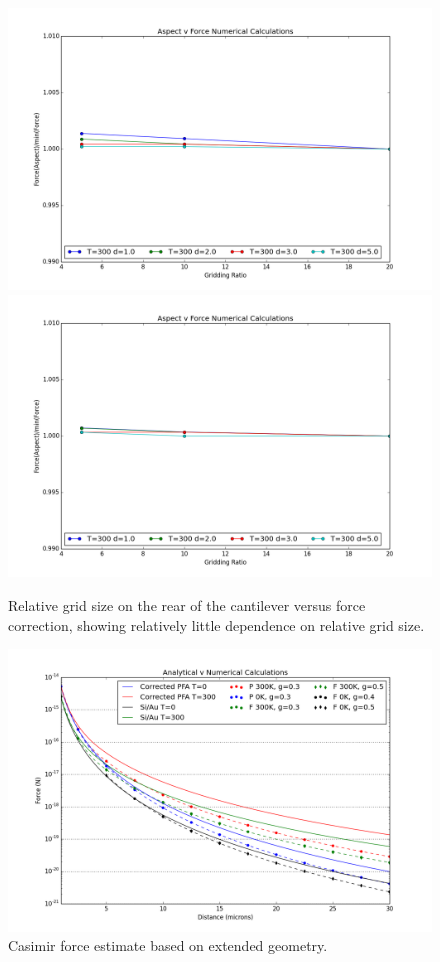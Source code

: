 \documentclass[11pt,traditabstract]{article}
\begin{document}
\begin{figure}[h]
\centering
\includegraphics[width=5.5in]{depth_correction}
\includegraphics[width=5.5in]{depth_correction_finite}
\caption{Relative grid size on the rear of the cantilever versus force correction, showing relatively little dependence on relative grid size.}\label{fig:depthCorr}
\end{figure}

\begin{figure}[h]
\centering
\includegraphics[width=7in]{analytic_v_numerical_best}
\caption{Casimir force estimate based on extended geometry.}\label{fig:estimate}
\end{figure}
\end{document}
